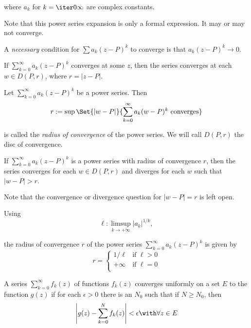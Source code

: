 where $a_k$ for $k=\iter0\infty$ are complex constants.

Note that this power series expansion is only a formal expression. It may or
may not converge.

A \textit{necessary} condition for $\sum a_k(z-P)^k$ to converge is that
$a_k(z-P)^k\to0$.

\label{d5d5bdc}

If $\sum_{k=0}^\infty a_k(z-P)^k$ converges at some $z$, then the series
converges at each $w\in D(P,r)$, where $r=|z-P|$.

\label{da6e337}

Let $\sum_{k=0}^\infty a_k(z-P)^k$ be a power series. Then
$$
  r:=\sup\Set{|w-P|}{\sum_{k=0}^\infty a_k(w-P)^k\text{ converges}}
$$

is called the \textit{radius of convergence} of the power series. We will call
$D(P,r)$ the disc of convergence.

\label{c7d0e1d}

If $\sum_{k=0}^\infty a_k(z-P)^k$ is a power series with radius of convergence
$r$, then the series converges for each $w\in D(P,r)$ and diverges for each $w$
such that $|w-P|>r$.

Note that the convergence or divergence question for $|w-P|=r$ is left open.

\label{a9ba20f}

Using
$$
  \ell:\limsup_{k\to+\infty}|a_k|^{1/k},
$$

the radius of convergence $r$ of the power series $\sum_{k=0}^\infty
a_k(z-P)^k$ is given by
\begin{equation*}
  r=\begin{cases}
    1/\ell  & \text{if } \ell>0 \\
    +\infty & \text{if } \ell=0 \\
  \end{cases}
\end{equation*}

\label{bba67e4}

A series $\sum_{k=0}^\infty f_k(z)$ of functions $f_k(z)$ converges uniformly
on a set $E$ to the function $g(z)$ if for each $\epsilon>0$ there is an $N_0$
such that if $N\geq N_0$, then
$$
  \left|g(z)-\sum_{k=0}^N f_k(z)\right|<\epsilon\with\forall z\in E
$$

\label{bfe260e}

